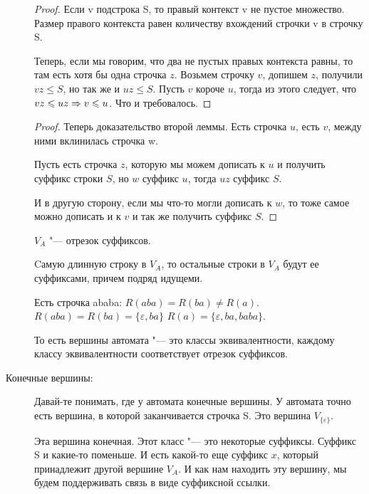 \begin{description}
    \begin{proof}
    Если v подстрока S, то правый контекст v не пустое множество. Размер правого контекста равен количеству 
    вхождений строчки v в строчку S. 

    Теперь, если мы говорим, что два не пустых правых контекста равны, то там есть хотя бы одна строчка $z$.
    Возьмем строчку $v$, допишем $z$, получили $vz \le S$, но так же и $uz \le S$. Пусть $v$ короче $u$, тогда
    из этого следует, что $vz \leqslant uz \Rightarrow v \leqslant u$. Что и требовалось.
    \end{proof}
    \begin{proof}
    Теперь доказательство второй леммы. Есть строчка $u$, есть $v$, между ними вклинилась строчка w. 

    Пусть есть строчка $z$, которую мы можем дописать к $u$ и получить суффикс строки $S$, но $w$ суффикс $u$, тогда $uz$  суффикс $S$.

    И в другую сторону, если мы что-то могли дописать к $w$, то тоже самое можно дописать и к $v$ и так же получить суффикс $S$.
    \end{proof}
    
    \begin{lemma}
    $V_A$ "--- отрезок суффиксов.
    \end{lemma}
    
    \begin{Rem}
    Cамую длинную строку в $V_A$, то остальные строки в $V_A$ будут ее суффиксами, причем подряд 
    идущеми. 
    \end{Rem}
    
    \begin{exmp}
    Есть строчка ababa:
    $R(aba) = R(ba) \ne R(a)$.
    $R(aba) = R(ba) = \{\varepsilon, ba\}$
    $R(a) = \{\varepsilon, ba, baba\}$.
    \end{exmp}

    То есть вершины автомата "--- это классы эквивалентности, каждому классу 
    эквивалентности соответствует отрезок суффиксов. 
    
    \item[Конечные вершины:]
    Давай-те понимать, где у автомата конечные вершины. У автомата точно есть 
    вершина, в которой заканчивается строчка S. Это вершина $V_{\{\varepsilon\}}$.

    Эта вершина конечная. Этот класс "--- это некоторые суффиксы. Суффикс S и какие-то поменьше.
    И есть какой-то еще суффикс $x$, который принадлежит другой вершине $V_A$. И как 
    нам находить эту вершину, мы будем поддерживать связь в виде суффиксной ссылки. 


\end{description}
